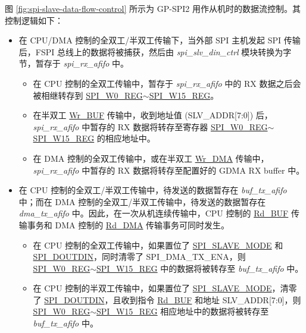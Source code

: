 \documentclass[main\_\_CN.tex]{subfiles}
\begin{document}
图 \ref{fig:spi-slave-data-flow-control} 所示为 GP-SPI2 用作从机时的数据流控制。其控制逻辑如下：
\begin{itemize}
    \item 在 CPU/DMA 控制的全双工/半双工传输下，当外部 SPI 主机发起 SPI 传输后，FSPI 总线上的数据将被捕获，然后由 \emph{spi\_slv\_din\_ctrl} 模块转换为字节，暂存于 \emph{spi\_rx\_afifo} 中。
    \begin{itemize}
        \item 在 CPU 控制的全双工传输中，暂存于 \emph{spi\_rx\_afifo} 中的 RX 数据之后会被相继转存到 \hyperref[regdesc:SPIW0REG]{SPI\_W0\_REG}$\sim$\hyperref[regdesc:SPIW15REG]{SPI\_W15\_REG}。

        \item 在半双工 \hyperref[cmd:wrbuf]{Wr\_BUF} 传输中，收到地址值 (SLV\_ADDR[7:0]) 后，\emph{spi\_rx\_afifo} 中暂存的 RX 数据将转存至寄存器 \hyperref[regdesc:SPIW0REG]{SPI\_W0\_REG}$\sim$\hyperref[regdesc:SPIW15REG]{SPI\_W15\_REG} 的相应地址中。

        \item 在 DMA 控制的全双工传输中，或在半双工 \hyperref[cmd:wrdma]{Wr\_DMA} 传输中，\emph{spi\_rx\_afifo} 中暂存的 RX 数据将转存至配置好的 GDMA RX buffer 中。

    \end{itemize}

    \item 在 CPU 控制的全双工/半双工传输中，待发送的数据暂存在 \emph{buf\_tx\_afifo} 中；而在 DMA 控制的全双工/半双工传输中，待发送的数据暂存在 \emph{dma\_tx\_afifo} 中。因此，在一次从机连续传输中，CPU 控制的 \hyperref[cmd:rdbuf]{Rd\_BUF} 传输事务和 DMA 控制的 \hyperref[cmd:rddma]{Rd\_DMA} 传输事务可同时发生。
    \begin{itemize}
        \item 在 CPU 控制的全双工传输中，如果置位了 \hyperref[fielddesc:SPISLAVEMODE]{SPI\_SLAVE\_MODE} 和 \hyperref[fielddesc:SPIDOUTDIN]{SPI\_DOUTDIN}，同时清零了 SPI\_DMA\_TX\_ENA，则 \hyperref[regdesc:SPIW0REG]{SPI\_W0\_REG}$\sim$\hyperref[regdesc:SPIW15REG]{SPI\_W15\_REG} 中的数据将被转存至 \emph{buf\_tx\_afifo} 中。

        \item 在 CPU 控制的半双工传输中，如果置位了 \hyperref[fielddesc:SPISLAVEMODE]{SPI\_SLAVE\_MODE}，清零了 \hyperref[fielddesc:SPIDOUTDIN]{SPI\_DOUTDIN}，且收到指令 \hyperref[cmd:rdbuf]{Rd\_BUF} 和地址 SLV\_ADDR[7:0]，则 \hyperref[regdesc:SPIW0REG]{SPI\_W0\_REG}$\sim$\hyperref[regdesc:SPIW15REG]{SPI\_W15\_REG} 相应地址中的数据将被转存至 \emph{buf\_tx\_afifo} 中。


\end{itemize}
\end{itemize}
\end{document}
